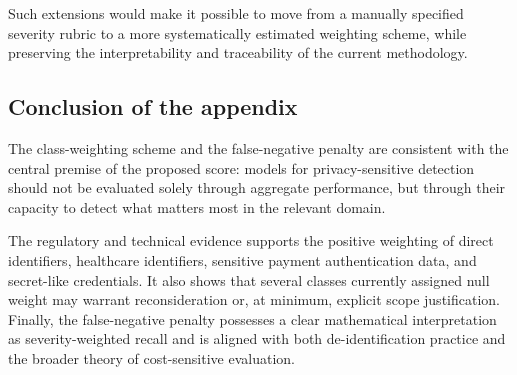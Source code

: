 \documentclass[11pt,a4paper]{article}
\begin{document}
Such extensions would make it possible to move from a manually specified severity rubric to a more systematically estimated weighting scheme, while preserving the interpretability and traceability of the current methodology.

\subsection{Conclusion of the appendix}

The class-weighting scheme and the false-negative penalty are consistent with the central premise of the proposed score: models for privacy-sensitive detection should not be evaluated solely through aggregate performance, but through their capacity to detect what matters most in the relevant domain.

The regulatory and technical evidence supports the positive weighting of direct identifiers, healthcare identifiers, sensitive payment authentication data, and secret-like credentials. It also shows that several classes currently assigned null weight may warrant reconsideration or, at minimum, explicit scope justification. Finally, the false-negative penalty possesses a clear mathematical interpretation as severity-weighted recall and is aligned with both de-identification practice and the broader theory of cost-sensitive evaluation.
\end{document}
